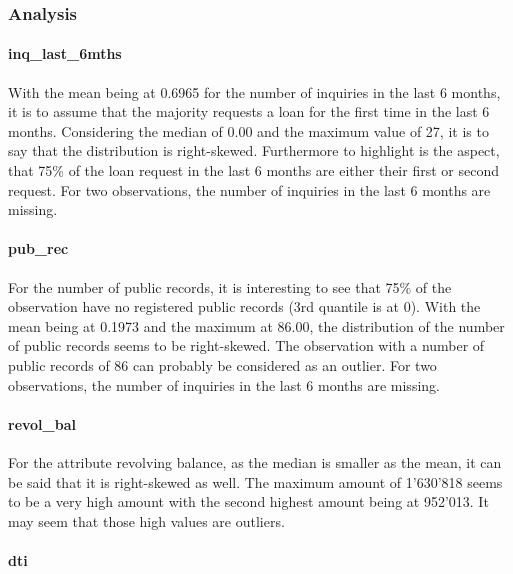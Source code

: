 \documentclass[
  letterpaper,
  DIV=11,
  numbers=noendperiod]{scrartcl}
\let\oldparagraph\paragraph
\renewcommand{\paragraph}[1]{\oldparagraph{#1}\mbox{}}
\begin{document}
\hypertarget{analysis}{%
\subsubsection{Analysis}\label{analysis}}

\hypertarget{inq_last_6mths}{%
\paragraph{inq\_last\_6mths}\label{inq_last_6mths}}

With the mean being at 0.6965 for the number of inquiries in the last 6
months, it is to assume that the majority requests a loan for the first
time in the last 6 months. Considering the median of 0.00 and the
maximum value of 27, it is to say that the distribution is right-skewed.
Furthermore to highlight is the aspect, that 75\% of the loan request in
the last 6 months are either their first or second request. For two
observations, the number of inquiries in the last 6 months are missing.

\hypertarget{pub_rec}{%
\paragraph{pub\_rec}\label{pub_rec}}

For the number of public records, it is interesting to see that 75\% of
the observation have no registered public records (3rd quantile is at
0). With the mean being at 0.1973 and the maximum at 86.00, the
distribution of the number of public records seems to be right-skewed.
The observation with a number of public records of 86 can probably be
considered as an outlier. For two observations, the number of inquiries
in the last 6 months are missing.

\hypertarget{revol_bal}{%
\paragraph{revol\_bal}\label{revol_bal}}

For the attribute revolving balance, as the median is smaller as the
mean, it can be said that it is right-skewed as well. The maximum amount
of 1'630'818 seems to be a very high amount with the second highest
amount being at 952'013. It may seem that those high values are
outliers.

\hypertarget{dti}{%
\paragraph{dti}\label{dti}}
\end{document}
